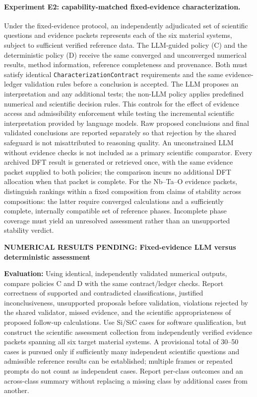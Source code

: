 \documentclass[11pt,a4paper]{article}
\newcommand{\newexperiment}[2]{\par\medskip\noindent\begingroup\color{red!80!black}\textbf{NUMERICAL RESULTS PENDING: #1}\par\noindent\textbf{Evaluation:} #2\par\endgroup\medskip}
\begin{document}
\label{sec:results_phase}
\paragraph{Experiment E2: capability-matched fixed-evidence characterization.}
Under the fixed-evidence protocol, an independently adjudicated set of scientific questions and evidence packets represents each of the six material systems, subject to sufficient verified reference data. The LLM-guided policy (C) and the deterministic policy (D) receive the same converged and unconverged numerical results, method information, reference completeness and provenance. Both must satisfy identical \texttt{CharacterizationContract} requirements and the same evidence-ledger validation rules before a conclusion is accepted. The LLM proposes an interpretation and any additional tests; the non-LLM policy applies predefined numerical and scientific decision rules. This controls for the effect of evidence access and admissibility enforcement while testing the incremental scientific interpretation provided by language models. Raw proposed conclusions and final validated conclusions are reported separately so that rejection by the shared safeguard is not misattributed to reasoning quality. An unconstrained LLM without evidence checks is not included as a primary scientific comparator. Every archived DFT result is generated or retrieved once, with the same evidence packet supplied to both policies; the comparison incurs no additional DFT allocation when that packet is complete.
For the Nb--Ta--O evidence packets, distinguish rankings within a fixed composition from claims of stability across compositions: the latter require converged calculations and a sufficiently complete, internally compatible set of reference phases. Incomplete phase coverage must yield an unresolved assessment rather than an unsupported stability verdict.
\newexperiment{Fixed-evidence LLM versus deterministic assessment}{Using identical, independently validated numerical outputs, compare policies C and D with the same contract/ledger checks. Report correctness of supported and contradicted classifications, justified inconclusiveness, unsupported proposals before validation, violations rejected by the shared validator, missed evidence, and the scientific appropriateness of proposed follow-up calculations. Use Si/SiC cases for software qualification, but construct the scientific assessment collection from independently verified evidence packets spanning all six target material systems. A provisional total of 30--50 cases is pursued only if sufficiently many independent scientific questions and admissible reference results can be established; multiple frames or repeated prompts do not count as independent cases. Report per-class outcomes and an across-class summary without replacing a missing class by additional cases from another.}
\end{document}
